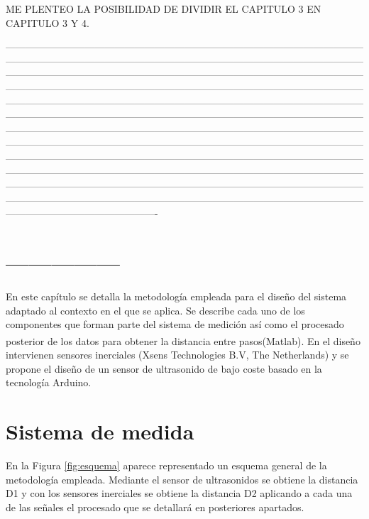 ME PLENTEO LA POSIBILIDAD DE DIVIDIR EL CAPITULO 3 EN CAPITULO 3 Y 4.


----------------------------------------------------------------------------------------------------------------------------------------------------------------------------------------------------------------------------------------------------------------------------------------------------------------------------------------------------------------------------------------------------------------------------------------------------------------------------------------------------------------------------------------------------------------------------------------------------------------------------------------------------------------------------------------------------------------------------------------------------------------------------------------------------------------------------------------------------------------------------------------------------------------------------------------------------------------------------------------------------------------------------------------------------------------------------------------------------------------------------------------------------------------------------------------------------------------------------------------------------------------------------------------------------------------------------------------------------------------------------------------------


\section{---------------}















En este capítulo se detalla la metodología empleada para el diseño del sistema adaptado al contexto en el que se aplica. Se describe cada uno de los componentes que forman parte del sistema de medición así como el procesado posterior de los datos para obtener la distancia entre pasos(Matlab\textsuperscript{\textregistered}). En el diseño intervienen sensores inerciales (Xsens Technologies B.V, The Netherlands) y se propone el diseño de un sensor de ultrasonido de bajo coste basado en la tecnología Arduino. 


\section{Sistema de medida}
En la Figura \ref{fig:esquema} aparece representado un esquema general de la metodología empleada. Mediante el sensor de ultrasonidos se obtiene la distancia D1 y con los sensores inerciales se obtiene la distancia D2 aplicando a cada una de las señales el procesado que se detallará en posteriores apartados.


